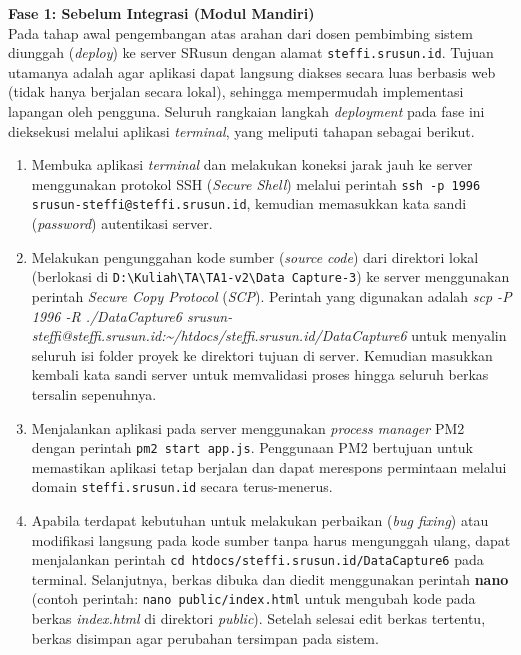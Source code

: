 \textbf{Fase 1: Sebelum Integrasi (Modul Mandiri)}\\
Pada tahap awal pengembangan atas arahan dari dosen pembimbing sistem diunggah (\textit{deploy}) ke server SRusun dengan alamat \texttt{steffi.srusun.id}. Tujuan utamanya adalah agar aplikasi dapat langsung diakses secara luas berbasis web (tidak hanya berjalan secara lokal), sehingga mempermudah implementasi lapangan oleh pengguna. Seluruh rangkaian langkah \textit{deployment} pada fase ini dieksekusi melalui aplikasi \textit{terminal}, yang meliputi tahapan sebagai berikut.

\begin{enumerate}[label=\alph*.]
    \item Membuka aplikasi \textit{terminal} dan melakukan koneksi jarak jauh ke server menggunakan protokol SSH (\textit{Secure Shell}) melalui perintah \texttt{ssh -p 1996 srusun-steffi@steffi.srusun.id}, kemudian memasukkan kata sandi (\textit{password}) autentikasi server.

    \item Melakukan pengunggahan kode sumber (\textit{source code}) dari direktori lokal (berlokasi di \texttt{D:\textbackslash Kuliah\textbackslash TA\textbackslash TA1-v2\textbackslash Data Capture-3}) ke server menggunakan perintah \textit{Secure Copy Protocol} (\textit{SCP}). Perintah yang digunakan adalah {\it scp -P 1996 -R ./DataCapture6 srusun-steffi@steffi.srusun.id:\textasciitilde/htdocs/steffi.srusun.id/DataCapture6} untuk menyalin seluruh isi folder proyek ke direktori tujuan di server. Kemudian masukkan kembali kata sandi server untuk memvalidasi proses hingga seluruh berkas tersalin sepenuhnya.
    
    \item Menjalankan aplikasi pada server menggunakan \textit{process manager} {PM2} dengan perintah \texttt{pm2 start app.js}. Penggunaan PM2 bertujuan untuk memastikan aplikasi tetap berjalan dan dapat merespons permintaan melalui domain \texttt{steffi.srusun.id} secara terus-menerus.

    \item Apabila terdapat kebutuhan untuk melakukan perbaikan (\textit{bug fixing}) atau modifikasi langsung pada kode sumber tanpa harus mengunggah ulang, dapat menjalankan perintah \texttt{cd htdocs/steffi.srusun.id/DataCapture6} pada terminal. Selanjutnya, berkas dibuka dan diedit menggunakan perintah \textbf{nano} (contoh perintah: \texttt{nano public/index.html} untuk mengubah kode pada berkas \textit{index.html} di direktori \textit{public}). Setelah selesai edit berkas tertentu, berkas disimpan agar perubahan tersimpan pada sistem. 


\end{enumerate}
